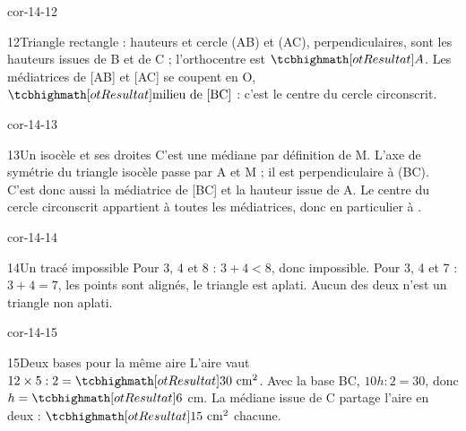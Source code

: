 \begin{blocLivre}{cor-14-12}\begin{corrige}{12}{Triangle rectangle : hauteurs et cercle}
(AB) et (AC), perpendiculaires, sont les hauteurs issues de B et de C ; l’orthocentre est $\res A$. Les médiatrices de [AB] et [AC] se coupent en O, $\res{\text{milieu de [BC]}}$ : c’est le centre du cercle circonscrit.
\label{fig-cor-14-12}
\end{corrige}\end{blocLivre}
\begin{blocLivre}{cor-14-13}\begin{corrige}{13}{Un isocèle et ses droites}
C’est une médiane par définition de M. L’axe de symétrie du triangle isocèle passe par A et M ; il est perpendiculaire à (BC). C’est donc aussi la médiatrice de [BC] et la hauteur issue de A. Le centre du cercle circonscrit appartient à toutes les médiatrices, donc en particulier à .
\label{fig-cor-14-13}
\end{corrige}\end{blocLivre}
\begin{blocLivre}{cor-14-14}\begin{corrige}{14}{Un tracé impossible}
Pour 3, 4 et 8 : $3+4<8$, donc impossible. Pour 3, 4 et 7 : $3+4=7$, les points sont alignés, le triangle est aplati. Aucun des deux n’est un triangle non aplati.
\label{fig-cor-14-14}
\end{corrige}\end{blocLivre}
\begin{blocLivre}{cor-14-15}\begin{corrige}{15}{Deux bases pour la même aire}
L’aire vaut $12\times5:2=\res{30\ \mathrm{cm}^2}$. Avec la base BC, $10h:2=30$, donc $h=\res6$ cm. La médiane issue de C partage l’aire en deux : $\res{15\ \mathrm{cm}^2}$ chacune.
\label{fig-cor-14-15}
\end{corrige}\end{blocLivre}
